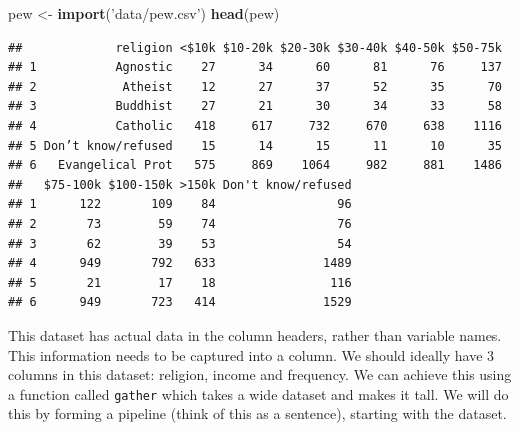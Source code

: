 \documentclass[12pt,letterpaperpaper,openany]{book}
\newenvironment{Shaded}{\begin{snugshade}}{\end{snugshade}}
\newcommand{\KeywordTok}[1]{\textcolor[rgb]{0.13,0.29,0.53}{\textbf{#1}}}
\newcommand{\NormalTok}[1]{#1}
\newcommand{\OperatorTok}[1]{\textcolor[rgb]{0.81,0.36,0.00}{\textbf{#1}}}
\newcommand{\StringTok}[1]{\textcolor[rgb]{0.31,0.60,0.02}{#1}}
\begin{document}
\begin{Shaded}
\begin{Highlighting}[]
\NormalTok{pew <-}\StringTok{ }\KeywordTok{import}\NormalTok{(}\StringTok{'data/pew.csv'}\NormalTok{)}
\KeywordTok{head}\NormalTok{(pew)}
\end{Highlighting}
\end{Shaded}

\begin{verbatim}
##             religion <$10k $10-20k $20-30k $30-40k $40-50k $50-75k
## 1           Agnostic    27      34      60      81      76     137
## 2            Atheist    12      27      37      52      35      70
## 3           Buddhist    27      21      30      34      33      58
## 4           Catholic   418     617     732     670     638    1116
## 5 Don’t know/refused    15      14      15      11      10      35
## 6   Evangelical Prot   575     869    1064     982     881    1486
##   $75-100k $100-150k >150k Don't know/refused
## 1      122       109    84                 96
## 2       73        59    74                 76
## 3       62        39    53                 54
## 4      949       792   633               1489
## 5       21        17    18                116
## 6      949       723   414               1529
\end{verbatim}

This dataset has actual data in the column headers, rather than variable names. This
information needs to be captured into a column. We should ideally have 3 columns in this
dataset: religion, income and frequency. We can achieve this using a function called \texttt{gather} which
takes a wide dataset and makes it tall. We will do this by forming a pipeline (think of this as a sentence),
starting with the dataset.

\begin{Shaded}
\end{Shaded}
\end{document}
